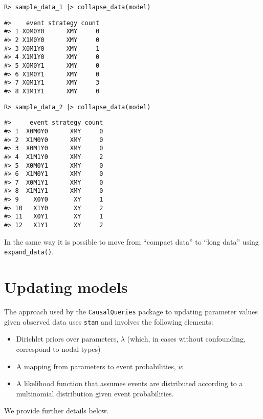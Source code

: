 \documentclass[
  11pt,
  article]{jss}
\providecommand{\tightlist}{%
  \setlength{\itemsep}{0pt}\setlength{\parskip}{0pt}}\usepackage{longtable,booktabs,array}
\begin{document}
\begin{verbatim}
R> sample_data_1 |> collapse_data(model)
\end{verbatim}

\begin{verbatim}
#>    event strategy count
#> 1 X0M0Y0      XMY     0
#> 2 X1M0Y0      XMY     0
#> 3 X0M1Y0      XMY     1
#> 4 X1M1Y0      XMY     0
#> 5 X0M0Y1      XMY     0
#> 6 X1M0Y1      XMY     0
#> 7 X0M1Y1      XMY     3
#> 8 X1M1Y1      XMY     0
\end{verbatim}

\begin{verbatim}
R> sample_data_2 |> collapse_data(model)
\end{verbatim}

\begin{verbatim}
#>     event strategy count
#> 1  X0M0Y0      XMY     0
#> 2  X1M0Y0      XMY     0
#> 3  X0M1Y0      XMY     0
#> 4  X1M1Y0      XMY     2
#> 5  X0M0Y1      XMY     0
#> 6  X1M0Y1      XMY     0
#> 7  X0M1Y1      XMY     0
#> 8  X1M1Y1      XMY     0
#> 9    X0Y0       XY     1
#> 10   X1Y0       XY     2
#> 11   X0Y1       XY     1
#> 12   X1Y1       XY     2
\end{verbatim}

In the same way it is possible to move from ``compact data'' to ``long
data'' using \texttt{expand\_data()}.

\hypertarget{sec-update}{%
\section{Updating models}\label{sec-update}}

The approach used by the \texttt{CausalQueries} package to updating
parameter values given observed data uses \texttt{stan} and involves the
following elements:

\begin{itemize}
\tightlist
\item
  Dirichlet priors over parameters, \(\lambda\) (which, in cases without
  confounding, correspond to nodal types)
\item
  A mapping from parameters to event probabilities, \(w\)
\item
  A likelihood function that assumes events are distributed according to
  a multinomial distribution given event probabilities.
\end{itemize}

We provide further details below.
\end{document}
